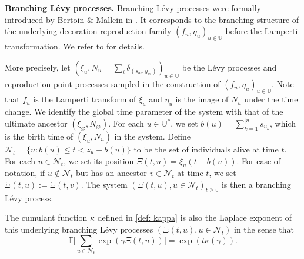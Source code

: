 \documentclass[12pt]{article}
\numberwithin{equation}{section}
\theoremstyle{plain}
\theoremstyle{definition}
\begin{document}
\noindent \textbf{Branching L\'evy processes.} Branching L\'evy processes were formally introduced by Bertoin \& Mallein in \cite{BertoinJean2019IRPM}. It corresponds to the branching structure of the underlying decoration reproduction family $(f_u, \eta_u)_{u \in \mathbb{U}}$ before the Lamperti transformation. We refer to \cite{MalleinBastien2023Anas} for details.

More precisely, let $(\xi_u, N_u =\sum_i\delta_ {(s_{ui}, y_{ui})})_{u\in \mathbb U}$ be the L\'evy processes and reproduction point processes sampled in the construction of $(f_u, \eta_u)_{u \in \mathbb{U}}$. Note that $f_u$ is the Lamperti transform of $\xi_u$ and $\eta_u$ is the image of $N_u$ under the time change. We identify the global time parameter of the system with that of the ultimate ancestor $(\xi_\varnothing, N_{\varnothing})$. For each $u\in\mathbb{U}^*$, we set $b(u) = \sum^{|u|}_{k=1} s_{u_k}$, which is the birth time of $(\xi_u, N_u)$ in the system. Define $\mathcal{N}_t = \{u: b(u)\leq t<z_u+b(u)\}$ to be the set of individuals alive at time $t$. For each $u\in \mathcal{N}_t$, we set its position $\Xi(t,u) = \xi_u(t-b(u))$. For ease of notation, if $u \notin \mathcal{N}_t$ but has an ancestor $v \in \mathcal{N}_t$ at time $t$, we set
\(\Xi(t,u) := \Xi(t,v)\). The system $(\Xi(t,u), u\in\mathcal{N}_t)_{t\geq 0}$ is then a branching L\'evy process.

The cumulant function $\kappa$ defined in \eqref{def: kappa} is also the Laplace exponent of this underlying branching L\'evy processes $(\Xi(t,u), u\in \mathcal{N}_t)$ in the sense that
\begin{equation}\label{eq: brl cumulant}
\mathbb{E}\bigg[\sum_{u\in\mathcal{N}_t} \exp(\gamma \Xi(t,u))\bigg] = \exp(t\kappa(\gamma)).
\end{equation}

\bigskip
\end{document}
